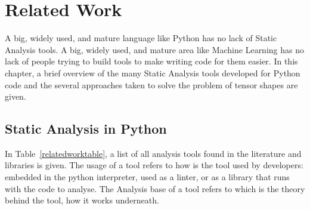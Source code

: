 \chapter{Related Work}\label{related-work}

A big, widely used, and mature language like Python has no lack of Static Analysis tools.
A big, widely used, and mature area like Machine Learning has no lack of people trying to
build tools to make writing code for them easier. In this chapter, a brief overview of the
many Static Analysis tools developed for Python code and the several approaches taken to
solve the problem of tensor shapes are given.

\section{Static Analysis in Python}


In Table~\ref{relatedworktable}, a list of all analysis tools found in the literature
and libraries is given. The usage of a tool refers to how is the tool used by developers:
embedded in the python interpreter, used as a linter, or as a library that runs with the
code to analyse. The Analysis base of a tool refers to which is the theory behind the
tool, how it works underneath.

